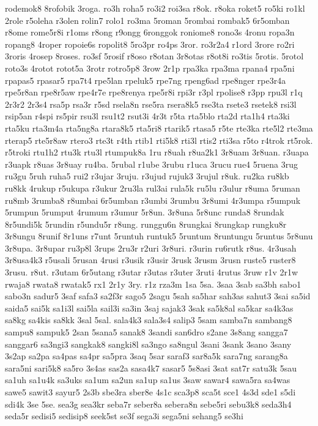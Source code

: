 {rodemok8 8rofobik 3roga. ro3h roha5 ro3i2 roi3sa r8ok. r8oka roket5 ro5ki
ro1kl 2role r5oleha r3olen rolin7 rolo1 ro3ma 5roman 5rombai rombak5
6r5omban r8ome rome5r8i r1oms r8ong r9ongg 6ronggok roniome8 rono3s 4ronu
ropa3n ropang8 4roper ropoie6s ropolit8 5ro3pr ro4ps 3ror. ro3r2a4 r1ord
3rore ro2ri 3roris 4rosep 8roses. ro3sf 5rosif r8oso r8otan 3r8otas r8ot8i
ro3tis 5rotis. 5rotol roto3s 4rotot rotot5a 3rotr rotro5p8 3row 2r1p
rpa3ka rpa3ma rpana4 rpa5ni rpapas5 rpasar5 rpa7t4 rpe5lan rpeluk5 rpe7ng
rpeng6ad rpe8nger rpe3r4a rpe5r8an rpe8r5aw rpe4r7e rpe8renya rpe5r8i
rpi3r r3pl rpolise8 r3pp rpu3l r1q 2r3r2 2r3s4 rsa5p rsa3r r5sd rsela8n
rse5ra rsera8k5 rse3ta rsete3 rsetek8 rsi3l rsip5an r4spi rs5pir rsu3l
rsu1t2 rsut3i 4r3t r5ta rta5blo rta2d rta1h4 rta3ki rta5ku rta3m4a
rta5ng8a rtara8k5 rta5ri8 rtarik5 rtasa5 r5te rte3ka rte5l2 rte3ma rterap5
rte5r8aw rtero3 rte3t r4th rtib1 rti5k8 rti3l rtis2 rti3sa r5to r4trok
rt5rok. r5troki rtu1h2 rtu3k rtu3l rtumpuk8a 1ru r8uah r8ua2k1 3r8uam
3r8uan. r3uapa r3uapk r8uas 3r8uay ru4ba. 5rubal r1ube 3rubu r1uca 3rucu
rue4 5ruena 3rug ru3gu 5ruh ruha5 rui2 r3ujar 3ruju. r3ujud rujuk3 3rujul
r8uk. ru2ka ru8kb ru8kk 4rukup r5ukupa r3ukur 2ru3la rul3ai rula5k ru5lu
r3ulur r8uma 5ruman ru8mb 3rumba8 r8umbai 6r5umban r3umbi 3rumbu 3r8umi
4r3umpa r5umpuk 5rumpun 5rumput 4rumum r3umur 5r8un. 3r8una 5r8unc runda8
8rundak 8r5undi5k 5rundin r5undu5r r8ung. runggu6n 8rungkai 8rungkap
rungku8r 3r8ungu 8runif 8r1uns r7unt 5runtuh runtuk5 5runtum 8runtungu
5runtus 5r8unu 3r8upa. 3r8upar ru3p8l 3rups 2ru3r r2uri 3r8uri. r3urin
ru6rutk r8us. 4r3usah 3r8usa4k3 r5usali 5rusan 4rusi r3usik r3usir 3rusk
3rusm 3rusn ruste5 ruster8 3rusu. r8ut. r3utam 6r5utang r3utar r3utas
r3uter 3ruti 4rutus 3ruw r1v 2r1w rwaja8 rwata8 rwatak5 rx1 2r1y 3ry. r1z
rza3m 1sa 5sa. 3saa 3sab sa3bh sabo1 sabo3n sadur5 3saf safa3 sa2f3r sago5
2sagu 5sah sa5har sah3as sahut3 3sai sa5id saida5 sai5k sa1i3l sai5la
sail3i sa3in 3saj sajak3 3sak sa5k8al sa5kar sa4k3as sa8kg sa4kis sa8kk
3sal 5sal. sala4k3 sala3s4 salip3 5sam samba7n sambang8 sampu8 sampuk5
2san 5sana5 sanak8 3sandi san6dro s2ane 3s8ang sangga7 sanggar6 sa3ngi3
sangkak8 sangki8l sa3ngo sa8ngul 3sani 3sank 3sano 3sany 3s2ap sa2pa
sa4pas sa4pr sa5pra 3saq 5sar saraf3 sar8a5k sara7ng sarang8a sara5ni
sari5k8 sa5ro 3s4as sas2a sasa4k7 sasar5 5s8asi 3sat sat7r satu3k 5sau
sa1uh sa1u4k sa3uks sa1um sa2un sa1up sa1us 3saw sawar4 sawa5ra sa4was
sawe5 sawit3 sayur5 2s3b sbe3ra sber8e 4s1c sca3p8 sca5t sce1 4s3d sde1
s5di sdi4k 3se 5se. sea3g sea3kr seba7r seber8a sebera8n sebe5ri sebu3k8
seda3h4 seda5r sedisi5 sedisip8 seek5st se3f sega3i sega5ni sehang5 se3hi
}
